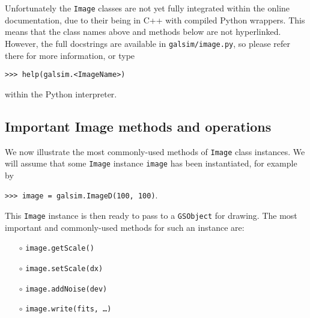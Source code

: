 \documentclass[preprint,11pt]{../../devel/modules/aastex}
\begin{document}
Unfortunately the \texttt{Image} classes are not yet fully integrated
within the online documentation, due to their being in C++ with
compiled Python wrappers.  This means that the class names above and
methods below are not hyperlinked.  However, the full docstrings are
available in \texttt{galsim/image.py}, so please refer there for more
information, or type

{\tt >>> help(galsim.<ImageName>)}

within the Python interpreter.

\subsection{Important Image methods and operations}\label{sect:imagemethods}
We now illustrate the most commonly-used methods of \texttt{Image}
class instances.  We will assume that some \texttt{Image} instance
\texttt{image} has been instantiated, for example by

{\tt >>> image = galsim.ImageD(100, 100)}.

This \texttt{Image} instance is then ready to pass to a
\texttt{GSObject} for drawing.  The most important and commonly-used
methods for such an instance are:
\begin{itemize}

\item[$\circ$] \texttt{image.getScale()} 

\item[$\circ$] \texttt{image.setScale(dx)} 

\item[$\circ$] \texttt{image.addNoise(dev)} 

\item[$\circ$] \texttt{image.write(fits, \dots)}  

\end{itemize}
\end{document}
